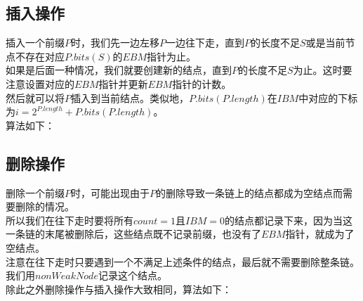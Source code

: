 \begin{algorithm}
\NoCaptionOfAlgo
\caption{$Match(P)$}
\end{algorithm}

\subsection{插入操作}

插入一个前缀$P$时，我们先一边左移$P$一边往下走，直到$P$的长度不足$S$或是当前节点不存在对应$P.bits(S)$的$EBM$指针为止。\\
\indent
如果是后面一种情况，我们就要创建新的结点，直到$P$的长度不足$S$为止。这时要注意设置对应的$EBM$指针并更新$EBM$指针的计数。\\
\indent
然后就可以将$P$插入到当前结点。类似地，$P.bits(P.length)$在$IBM$中对应的下标为$i = 2^{P.length} + P.bits(P.length)$。\\
\indent
算法如下：

\begin{algorithm}
\NoCaptionOfAlgo
\caption{$Insert(P)$}
\end{algorithm}

\subsection{删除操作}

删除一个前缀$P$时，可能出现由于$P$的删除导致一条链上的结点都成为空结点而需要删除的情况。\\
\indent
所以我们在往下走时要将所有$count = 1$且$IBM = 0$的结点都记录下来，因为当这一条链的末尾被删除后，这些结点既不记录前缀，也没有了$EBM$指针，就成为了空结点。\\
\indent
注意在往下走时只要遇到一个不满足上述条件的结点，最后就不需要删除整条链。我们用$nonWeakNode$记录这个结点。\\
\indent
除此之外删除操作与插入操作大致相同，算法如下：

